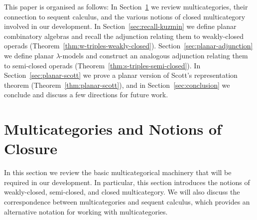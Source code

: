 \documentclass{llncs}
\begin{document}
This paper is organised as follows: In Section~\ref{sec:background} we review multicategories, their connection to sequent calculus, and the various notions of closed multicategory involved in our development. In Section~\ref{sec:recall-kuzmin} we define planar combinatory algebras and recall the adjunction relating them to weakly-closed operads (Theorem~\ref{thm:w-triples-weakly-closed}). Section~\ref{sec:planar-adjunction} we define planar $\lambda$-models and construct an analogous adjunction relating them to semi-closed operads (Theorem~\ref{thm:s-triples-semi-closed}). In Section~\ref{sec:planar-scott} we prove a planar version of Scott's representation theorem (Theorem~\ref{thm:planar-scott}), and in Section~\ref{sec:conclusion} we conclude and discuss a few directions for future work.

\section{Multicategories and Notions of Closure}\label{sec:background}
In this section we review the basic multicategorical machinery that will be required in our development. In particular, this section introduces the notions of weakly-closed, semi-closed, and closed multicategory. We will also discuss the correspondence between multicategories and sequent calculus, which provides an alternative notation for working with multicategories.
\end{document}
